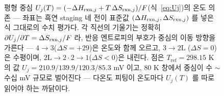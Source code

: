 \begin{figure}[t]
\caption{평형 중심 $U_j(T)=(-\Delta H_{\mathrm{rxn},j}+T\,\Delta S_{\mathrm{rxn},j})/F$(식~\eqref{eq:Uj})의 온도
의존 --- 좌표는 흑연 staging 네 전이 표준값 $(\Delta H_{\mathrm{rxn},j},\Delta S_{\mathrm{rxn},j})$ 를 넣은 식 그대로의
수치 평가다. 각 직선의 기울기는 정확히 $\partial U_j/\partial T=\Delta S_{\mathrm{rxn},j}/F$ 라, 반응 엔트로피의
부호가 중심의 이동 방향을 가른다 --- $4\!\to\!3$($\Delta S{=}{+}29$)은 온도와 함께 오르고, $3\!\to\!2\mathrm L$
($\Delta S{=}0$)은 수평이며, $2\mathrm L\!\to\!2\cdot2\!\to\!1$($\Delta S{<}0$)은 내린다. 점은 $T_\mathrm{ref}{=}298.15$
K 의 값 $U_j{=}210.9/139.9/120.3/85.3$ mV 이고, $80$ K 창에서 중심이 수 $\sim$수십 mV 규모로 벌어진다 ---
다온도 피팅이 온도마다 $U_j(T)$ 를 따로 읽어야 하는 까닭이다.}
\label{fig:cand-fo1-1}
\end{figure}
